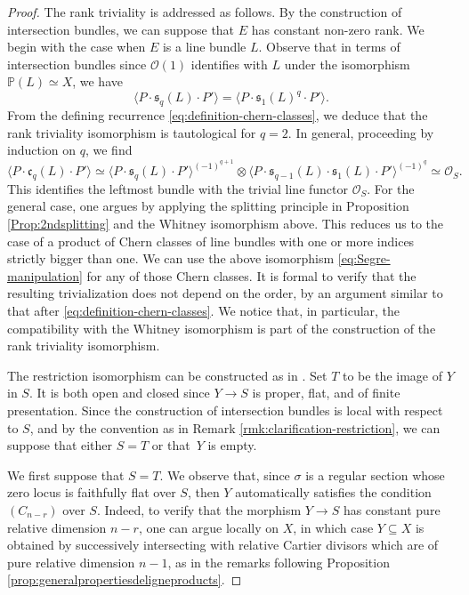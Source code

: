 \documentclass[JEP,XML,SOM,Unicode,published]{cedram}
\theoremstyle{plain}
\theoremstyle{definition}
\newcommand{\PBbb}{\mathbb P}
\newcommand{\Ocal}{\mathcal O}
\newcommand{\cfrak}{\mathfrak c}
\newcommand{\sfrak}{\mathfrak s}
\begin{document}
\begin{proof}
The rank triviality is addressed as follows. By the construction of intersection bundles, we can suppose that $E$ has constant non-zero rank. We begin with the case when $E$ is a line bundle $L$. Observe that in terms of intersection bundles since $\Ocal(1)$ identifies with $L$ under the isomorphism $\PBbb(L)\simeq X$, we have
\begin{displaymath}
\langle P \cdot \sfrak_q(L) \cdot P' \rangle = \langle P \cdot \sfrak_1(L)^q \cdot P' \rangle.
\end{displaymath}
From the defining recurrence \eqref{eq:definition-chern-classes}, we deduce that the rank triviality isomorphism is tautological for $q=2$. In general, proceeding by induction on $q$, we find
\begin{equation}\label{eq:Segre-manipulation}
\langle P \cdot \cfrak_{q}(L) \cdot P' \rangle \simeq \langle P \cdot \sfrak_{q}(L) \cdot P' \rangle^{(-1)^{q+1}} \otimes \langle P \cdot \sfrak_{q-1}(L) \cdot \sfrak_1(L) \cdot P' \rangle^{(-1)^{q}} \simeq \Ocal_S.
\end{equation}
This identifies the leftmost bundle with the trivial line functor $\Ocal_S$. For the general case, one argues by applying the splitting principle in Proposition \ref{Prop:2ndsplitting} and the Whitney isomorphism above. This reduces us to the case of a product of Chern classes of line bundles with one or more indices strictly bigger than one. We can use the above isomorphism \eqref{eq:Segre-manipulation} for any of those Chern classes. It is formal to verify that the resulting trivialization does not depend on the order, by an argument similar to that after \eqref{eq:definition-chern-classes}. We notice that, in particular, the compatibility with the Whitney isomorphism is part of the construction of the rank triviality isomorphism.

The restriction isomorphism can be constructed as in \cite[\textsection V.4.9]{Elkikfib}. Set $T$ to be the image of $Y$ in $S$. It is both open and closed since $Y\to S$ is proper, flat, and of finite presentation. Since the construction of intersection bundles is local with respect to $S$, and by the convention as in Remark \ref{rmk:clarification-restriction}, we can suppose that either $S = T$ or that~$Y$ is empty.

We first suppose that $S=T$. We observe that, since $\sigma$ is a regular section whose zero locus is faithfully flat over $S$, then $Y$ automatically satisfies the condition $(C_{n-r})$ over $S$. Indeed, to verify that the morphism $Y \to S$ has constant pure relative dimension $n-r$, one can argue locally on $X$, in which case $Y \subseteq X$ is obtained by successively intersecting with relative Cartier divisors which are of pure relative dimension $n-1$, as in the remarks following Proposition \ref{prop:generalpropertiesdeligneproducts}.


\end{proof}
\end{document}
